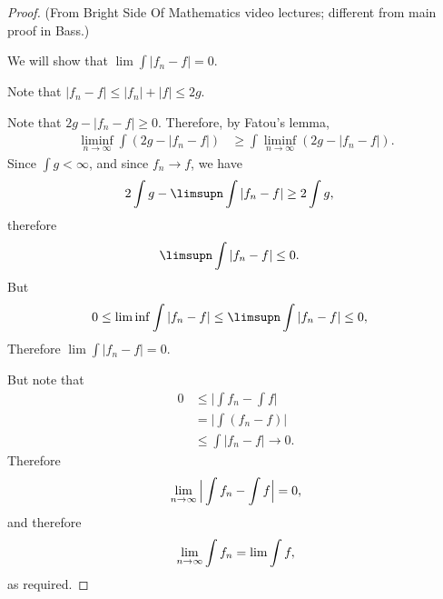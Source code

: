 \begin{proof}

  (From Bright Side Of Mathematics video lectures; different from main proof in Bass.)

  We will show that $\lim \int |f_n - f| = 0$.

  Note that $|f_n - f| \leq |f_n| + |f| \leq 2g$.

  Note that $2g - |f_n - f| \geq 0$. Therefore, by Fatou's lemma,
  \begin{align*}
    \liminf_{n\to\infty} \int (2g - |f_n - f|) &\geq \int \liminf_{n\to\infty} (2g - |f_n - f|).
  \end{align*}
  Since $\int g < \infty$, and since $f_n \to f$, we have
  \begin{align*}
    2\int g -  \limsupn \int |f_n - f| &\geq 2\int g,
  \end{align*}
  therefore
  \begin{align*}
    \limsupn \int |f_n - f| &\leq 0.
  \end{align*}
  But
  \begin{align*}
    0 \leq \liminf \int |f_n - f| \leq \limsupn \int |f_n - f| &\leq 0,
  \end{align*}
  Therefore $\lim \int |f_n - f| = 0$.

  But note that
  \begin{align*}
    0
    &\leq \Big|\int f_n - \int f\Big| \\
    &= \Big|\int (f_n - f)\Big| \\
    &\leq \int |f_n - f| \to 0.
  \end{align*}
  Therefore
  \begin{align*}
    \limn \Big|\int f_n - \int f\Big| = 0,
  \end{align*}
  and therefore
  \begin{align*}
    \limn \int f_n = \lim \int f,
  \end{align*}
  as required.
\end{proof}


